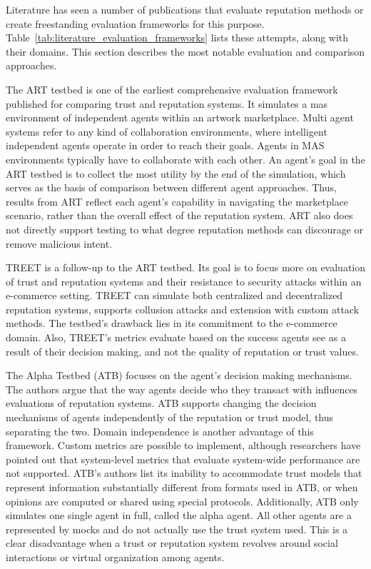 \documentclass[%
    ]{\PathToTumTemplate/thesis/tum_thesis}
\begin{document}
Literature has seen a number of publications that evaluate reputation methods or create freestanding evaluation frameworks for this purpose.
Table~\ref{tab:literature_evaluation_frameworks} lists these attempts, along with their domains.
This section describes the most notable evaluation and comparison approaches.

The ART testbed is one of the earliest comprehensive evaluation framework published for comparing trust and reputation systems\cite{fullam_specication_2005}.
It simulates a \acrfull{mas} environment of independent agents within an artwork marketplace.
Multi agent systems refer to any kind of collaboration environments, where intelligent independent agents operate in order to reach their goals.
Agents in MAS environments typically have to collaborate with each other.
An agent's goal in the ART testbed is to collect the most utility by the end of the simulation, which serves as the basis of comparison between different agent approaches.
Thus, results from ART reflect each agent's capability in navigating the marketplace scenario, rather than the overall effect of the reputation system.
ART also does not directly support testing to what degree reputation methods can discourage or remove malicious intent.

TREET is a follow-up to the ART testbed\cite{kerr_treet_2010}.
Its goal is to focus more on evaluation of trust and reputation systems and their resistance to security attacks within an e-commerce setting.
TREET can simulate both centralized and decentralized reputation systems, supports collusion attacks and extension with custom attack methods.
The testbed's drawback lies in its commitment to the e-commerce domain.
Also, TREET's metrics evaluate based on the success agents see as a result of their decision making, and not the quality of reputation or trust values.

The Alpha Testbed (ATB) focuses on the agent's decision making mechanisms\cite{jelenc_decision_2013}.
The authors argue that the way agents decide who they transact with influences evaluations of reputation systems.
ATB supports changing the decision mechanisms of agents independently of the reputation or trust model, thus separating the two.
Domain independence is another advantage of this framework.
Custom metrics are possible to implement, although researchers have pointed out that system-level metrics that evaluate system-wide performance are not supported\cite{adamopoulou_simulation_2014}.
ATB's authors list its inability to accommodate trust models that represent information substantially different from formats used in ATB, or when opinions are computed or shared using special protocols.
Additionally, ATB only simulates one single agent in full, called the alpha agent.
All other agents are a represented by mocks and do not actually use the trust system used.
This is a clear disadvantage when a trust or reputation system revolves around social interactions or virtual organization among agents.
\end{document}

